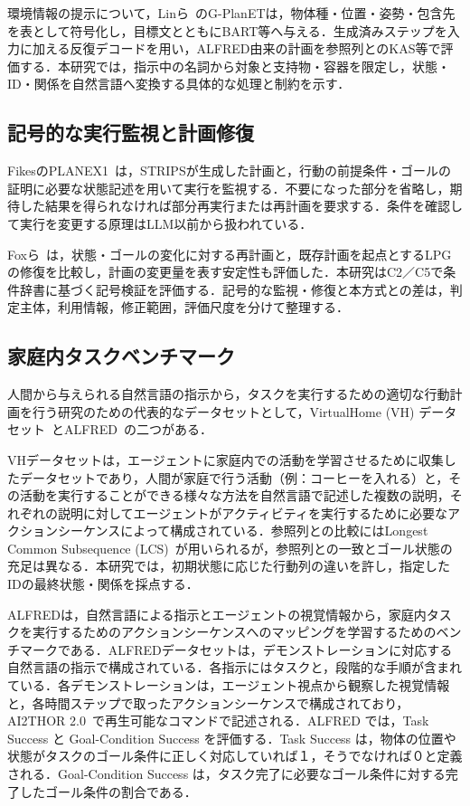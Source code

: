 環境情報の提示について，Linら~\cite{lin2023grounded}のG-PlanETは，物体種・位置・姿勢・包含先を表として符号化し，目標文とともにBART等へ与える．生成済みステップを入力に加える反復デコードを用い，ALFRED由来の計画を参照列とのKAS等で評価する．本研究では，指示中の名詞から対象と支持物・容器を限定し，状態・ID・関係を自然言語へ変換する具体的な処理と制約を示す．

\subsection{記号的な実行監視と計画修復}\label{sec2.monitoring}
FikesのPLANEX1~\cite{fikes1971planex}は，STRIPSが生成した計画と，行動の前提条件・ゴールの証明に必要な状態記述を用いて実行を監視する．不要になった部分を省略し，期待した結果を得られなければ部分再実行または再計画を要求する．条件を確認して実行を変更する原理はLLM以前から扱われている．

Foxら~\cite{fox2006stability}は，状態・ゴールの変化に対する再計画と，既存計画を起点とするLPGの修復を比較し，計画の変更量を表す安定性も評価した．本研究はC2／C5で条件辞書に基づく記号検証を評価する．記号的な監視・修復と本方式との差は，判定主体，利用情報，修正範囲，評価尺度を分けて整理する．


\subsection{家庭内タスクベンチマーク}\label{sec2.2}
人間から与えられる自然言語の指示から，タスクを実行するための適切な行動計画を行う研究のための代表的なデータセットとして，VirtualHome (VH) データセット~\cite{Puig_2018_CVPR}とALFRED~\cite{ALFRED20}の二つがある．

VHデータセットは，エージェントに家庭内での活動を学習させるために収集したデータセットであり，人間が家庭で行う活動（例：コーヒーを入れる）と，その活動を実行することができる様々な方法を自然言語で記述した複数の説明，それぞれの説明に対してエージェントがアクティビティを実行するために必要なアクションシーケンスによって構成されている．参照列との比較にはLongest Common Subsequence (LCS)~\cite{Puig_2018_CVPR}が用いられるが，参照列との一致とゴール状態の充足は異なる．本研究では，初期状態に応じた行動列の違いを許し，指定したIDの最終状態・関係を採点する．

ALFREDは，自然言語による指示とエージェントの視覚情報から，家庭内タスクを実行するためのアクションシーケンスへのマッピングを学習するためのベンチマークである．ALFREDデータセットは，デモンストレーションに対応する自然言語の指示で構成されている．各指示にはタスクと，段階的な手順が含まれている．各デモンストレーションは，エージェント視点から観察した視覚情報と，各時間ステップで取ったアクションシーケンスで構成されており，AI2THOR 2.0~\cite{ai2thor}で再生可能なコマンドで記述される．ALFRED では，Task Success と Goal-Condition Success を評価する．Task Success は，物体の位置や状態がタスクのゴール条件に正しく対応していれば１，そうでなければ０と定義される．Goal-Condition Success は，タスク完了に必要なゴール条件に対する完了したゴール条件の割合である．

